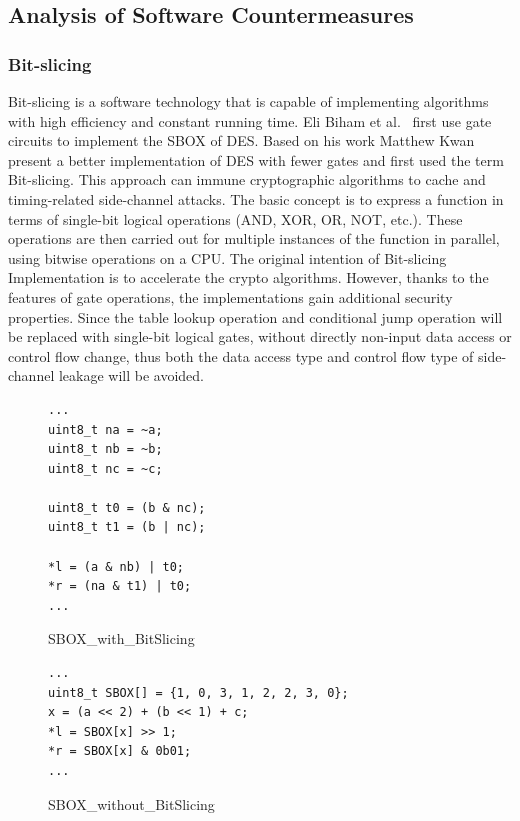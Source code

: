 \subsection{Analysis of Software Countermeasures}\label{sec:eval_countermeasures}
\subsubsection{Bit-slicing}
Bit-slicing is a software technology that is capable of implementing algorithms
with high efficiency and constant running time. Eli Biham et al.\ \cite{xxxxxxx} first
use gate circuits to implement the SBOX of DES\@.
Based on his work Matthew Kwan present a better implementation of DES with fewer
gates and first used the term Bit-slicing.
This approach can immune cryptographic algorithms to cache and timing-related
side-channel attacks. The basic concept is to express a function in terms of
single-bit logical operations (AND, XOR, OR, NOT, etc.). These operations are
then carried out for multiple instances of the function in parallel, using
bitwise operations on a CPU. The original intention of Bit-slicing
Implementation is to accelerate the crypto algorithms. However, thanks to the
features of gate operations, the implementations gain additional security
properties. Since the table lookup operation and conditional jump operation will
be replaced with single-bit logical gates, without directly non-input data
access or control flow change, thus both the data access type and control flow
type of side-channel leakage will be avoided.

\begin{figure}[h!]
    \centering
    \begin{lstlisting}[xleftmargin=.02\textwidth,xrightmargin=.01\textwidth]
...
uint8_t na = ~a;
uint8_t nb = ~b;
uint8_t nc = ~c;

uint8_t t0 = (b & nc);
uint8_t t1 = (b | nc);

*l = (a & nb) | t0;
*r = (na & t1) | t0;
...
\end{lstlisting}
    \caption{SBOX\_with\_BitSlicing}
    \label{SBOX_bitslicing}
\end{figure}

\begin{figure}[h!]
    \centering
    \begin{lstlisting}[xleftmargin=.02\textwidth,xrightmargin=.01\textwidth]
...
uint8_t SBOX[] = {1, 0, 3, 1, 2, 2, 3, 0};
x = (a << 2) + (b << 1) + c;
*l = SBOX[x] >> 1;
*r = SBOX[x] & 0b01;
...
\end{lstlisting}
    \caption{SBOX\_without\_BitSlicing}
    \label{SBOX_da}
\end{figure}

